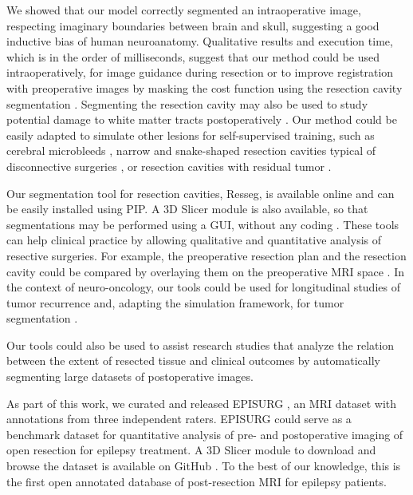 We showed that our model correctly segmented an intraoperative image, respecting imaginary boundaries between brain and skull, suggesting a good inductive bias of human neuroanatomy.
Qualitative results and execution time, which is in the order of milliseconds, suggest that our method could be used intraoperatively, for image guidance during resection or to improve registration with preoperative images by masking the cost function using the resection cavity segmentation \cite{brett_spatial_2001}.
Segmenting the resection cavity may also be used to study potential damage to white matter tracts postoperatively \cite{winston_optic_2012}.
Our method could be easily adapted to simulate other lesions for self-supervised training, such as cerebral microbleeds \cite{cuadrado-godia_cerebral_2018}, narrow and snake-shaped resection cavities typical of disconnective surgeries \cite{mohamed_temporoparietooccipital_2011}, or resection cavities with residual tumor \cite{meier_automatic_2017}.

Our segmentation tool for resection cavities, Resseg, is available online%
and can be easily installed using \ac{PIP}.
A 3D Slicer module is also available, so that segmentations may be performed using a \ac{GUI}, without any coding%
.
These tools can help clinical practice by allowing qualitative and quantitative analysis of resective surgeries.
For example, the preoperative resection plan and the resection cavity could be compared by overlaying them on the preoperative \ac{MRI} space \cite{nowell_utility_2015,nowell_resection_2017}.
In the context of neuro-oncology, our tools could be used for longitudinal studies of tumor recurrence \cite{meier_automatic_2017} and, adapting the simulation framework, for tumor segmentation \cite{zhang_self-supervised_2021}.

Our tools could also be used to assist research studies that analyze the relation between the extent of resected tissue and clinical outcomes \cite{taylor_impact_2018,galovic_association_2019} by automatically segmenting large datasets of postoperative images.

As part of this work, we curated and released EPISURG \cite{perez-garcia_episurg_2020}, an \ac{MRI} dataset with annotations from three independent raters.
EPISURG could serve as a benchmark dataset for quantitative analysis of pre- and postoperative imaging of open resection for epilepsy treatment.
A 3D Slicer module to download and browse the dataset is available on GitHub%
.
To the best of our knowledge, this is the first open annotated database of post-resection \ac{MRI} for epilepsy patients.
